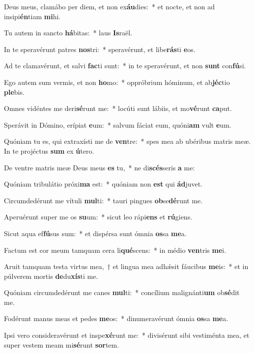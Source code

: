 \item Deus meus, clamábo per diem, et non ex\textbf{áu}dies:~* et nocte, et non ad insipi\textbf{én}tiam \textbf{mi}hi.
\item Tu autem in sancto \textbf{há}bitas:~* laus \textbf{Is}raël.
\item In te speravérunt patres \textbf{nos}tri:~* speravérunt, et libe\textbf{rás}ti \textbf{e}os.
\item Ad te clamavérunt, et salvi \textbf{fac}ti sunt:~* in te speravérunt, et non \textbf{sunt} con\textbf{fú}si.
\item Ego autem sum vermis, et non \textbf{ho}mo:~* oppróbrium hóminum, et ab\textbf{jéc}tio \textbf{ple}bis.
\item Omnes vidéntes me deri\textbf{sé}runt me:~* locúti sunt lábiis, et mo\textbf{vé}runt \textbf{ca}put.
\item Sperávit in Dómino, erípiat \textbf{e}um:~* salvum fáciat eum, quóni\textbf{am} vult \textbf{e}um.
\item Quóniam tu es, qui extraxísti me de \textbf{ven}tre:~* spes mea ab ubéribus matris meæ. In te projéctus \textbf{sum} ex \textbf{ú}tero.
\item De ventre matris meæ Deus meus \textbf{es} tu,~* ne di\textbf{scés}seris \textbf{a} me:
\item Quóniam tribulátio próxi\textbf{ma} est:~* quóniam non \textbf{est} qui \textbf{ád}juvet.
\item Circumdedérunt me vítuli \textbf{mul}ti:~* tauri pingues \textbf{ob}se\textbf{dé}runt me.
\item Aperuérunt super me os \textbf{su}um:~* sicut leo rápi\textbf{ens} et \textbf{rú}giens.
\item Sicut aqua ef\textbf{fú}sus sum:~* et dispérsa sunt ómnia \textbf{os}sa \textbf{me}a.
\item Factum est cor meum tamquam cera li\textbf{qué}scens:~* in médio \textbf{ven}tris \textbf{me}i.
\item Aruit tamquam testa virtus mea,~† et lingua mea adhǽsit fáucibus \textbf{me}is:~* et in púlverem mortis \textbf{de}du\textbf{xís}ti me.
\item Quóniam circumdedérunt me canes \textbf{mul}ti:~* concílium malignánti\textbf{um} ob\textbf{sé}dit me.
\item Fodérunt manus meas et pedes \textbf{me}os:~* dinumeravérunt ómnia \textbf{os}sa \textbf{me}a.
\item Ipsi vero consideravérunt et inspe\textbf{xé}runt me:~* divisérunt sibi vestiménta mea, et super vestem meam mi\textbf{sé}runt \textbf{sor}tem.
